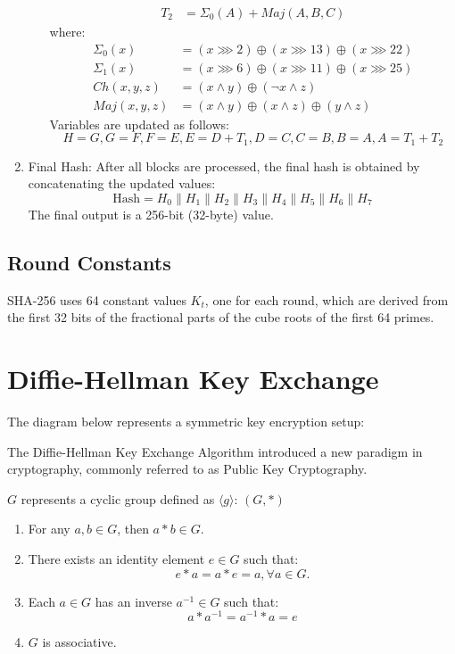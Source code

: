 \documentclass{article}
\begin{document}
\begin{enumerate}
\begin{enumerate}
\begin{align*}
            T_2 &= \Sigma_0(A) + Maj(A, B, C)
        \end{align*}
        where:
        \begin{align*}
            \Sigma_0(x) &= (x \ggg 2) \oplus (x \ggg 13) \oplus (x \ggg 22) \\
            \Sigma_1(x) &= (x \ggg 6) \oplus (x \ggg 11) \oplus (x \ggg 25) \\
            Ch(x, y, z) &= (x \land y) \oplus (\neg x \land z) \\
            Maj(x, y, z) &= (x \land y) \oplus (x \land z) \oplus (y \land z)
        \end{align*}
        Variables are updated as follows:
        \[ H = G, G = F, F = E, E = D + T_1, D = C, C = B, B = A, A = T_1 + T_2 \]
    \end{enumerate}
    \item Final Hash: After all blocks are processed, the final hash is obtained by concatenating the updated values:
    \[ \text{Hash} = H_0 \parallel H_1 \parallel H_2 \parallel H_3 \parallel H_4 \parallel H_5 \parallel H_6 \parallel H_7 \]
    The final output is a 256-bit (32-byte) value.
\end{enumerate}

\subsection{Round Constants}

SHA-256 uses 64 constant values $K_t$, one for each round, which are derived from the first 32 bits of the fractional parts of the cube roots of the first 64 primes.

\section{Diffie-Hellman Key Exchange}

The diagram below represents a symmetric key encryption setup:


The Diffie-Hellman Key Exchange Algorithm introduced a new paradigm in cryptography, commonly referred to as Public Key Cryptography.

$G$ represents a cyclic group defined as $\langle g \rangle$: $(G, *)$

\begin{enumerate}
    \item For any $a, b \in G$, then $a * b \in G$.
    \item There exists an identity element $e \in G$ such that:
    \[ e * a = a * e = a, \forall a \in G. \]
    \item Each $a \in G$ has an inverse $a^{-1} \in G$ such that:
    \[ a * a^{-1} = a^{-1} * a = e \]
    \item $G$ is associative.
\end{enumerate}
\end{document}
